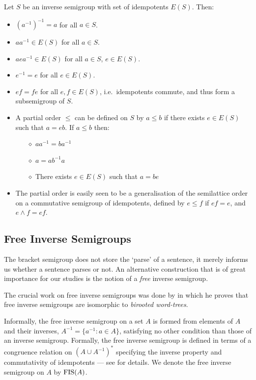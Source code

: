 \documentclass[12pt]{report}
\begin{document}
Let $S$ be an inverse semigroup with set of idempotents $E(S)$. Then:
\begin{itemize}
\item $(a^{-1})^{-1} = a$ for all $a\in S$.
\item $aa^{-1} \in E(S)$ for all $a \in S$.
\item $aea^{-1} \in E(S)$ for all $a \in S$, $e\in E(S)$.
\item $e^{-1} = e$ for all $e \in E(S)$.
\item $ef=fe$ for all $e,f \in E(S)$, i.e.~idempotents commute, and thus form a subsemigroup of $S$.
\item A partial order $\le$ can be defined on $S$ by $a \le b$ if there exists $e \in E(S)$ such  that $a=eb$. If $a \le b$ then:
\begin{itemize}
\item[$\diamond$] $aa^{-1} = ba^{-1}$
\item[$\diamond$] $a = ab^{-1}a$
\item[$\diamond$] There exists $e \in E(S)$ such that $a=be$
\end{itemize}
\item The partial order is easily seen to be a generalisation of the semilattice order on a commutative semigroup of idempotents, defined by $e \le f$ if $ef = e$, and $e \land f = ef$.
\end{itemize}

\subsection{Free Inverse Semigroups}

The bracket semigroup does not store the `parse' of a sentence, it merely informs us whether a sentence parses or not. An alternative construction that is of great importance for our studies is the notion of a \emph{free} inverse semigroup.

The crucial work on free inverse semigroups was done by \cite{Munn:74} in which he proves that free inverse semigroups are isomorphic to \emph{birooted word-trees}.

Informally, the free inverse semigroup on a set $A$ is formed from elements of $A$ and their inverses, $A^{-1} = \{a^{-1} : a \in A\}$, satisfying no other condition than those of an inverse semigroup. Formally, the free inverse semigroup is defined in terms of a congruence relation on $(A \cup A^{-1})^*$ specifying the inverse property and commutativity of idempotents --- see \cite{Munn:74} for details. We denote the free inverse semigroup on $A$ by $\operatorname{FIS}(A)$.
\end{document}
